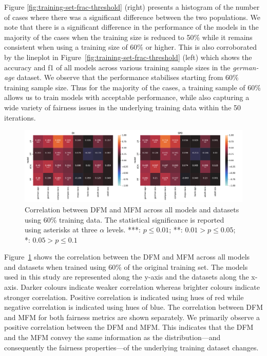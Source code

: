 \documentclass{article}
\begin{document}
Figure \ref{fig:training-set-frac-threshold} (right) presents
a histogram of the number of cases where there was a significant
difference between the two populations. We note that there is
a significant difference in the performance of the models in the
majority of the cases when the training size is reduced to 50\% while
it remains consistent when using a training size of 60\% or
higher. This is also corroborated by the lineplot in
Figure \ref{fig:training-set-frac-threshold} (left) which shows the
accuracy and f1 of all models across various training sample sizes in
the \emph{german-age} dataset. We observe that the performance
stabilises starting from 60\% training sample size. Thus for the
majority of the cases, a training sample of 60\% allows us to train
models with acceptable performance, while also capturing a wide
variety of fairness issues in the underlying training data within the
50 iterations.

\begin{figure}
  \centering
  \includegraphics[width=\linewidth]{heatmap--corr--training-sets-frac.pdf}
  \caption{Correlation between DFM and MFM across all models and
  datasets using 60\% training data. The statistical significance is
  reported using asterisks at three $\alpha$ levels. ***: $p \le
  0.01$; **: $0.01 > p \le 0.05$; *: $0.05 > p \le 0.1$}
  \label{fig:heatmap--corr--training-sets-frac}
\end{figure}

Figure \ref{fig:heatmap--corr--training-sets-frac} shows the
correlation between the DFM and MFM across all models and datasets
when trained using 60\% of the original training set. The models used
in this study are represented along the y-axis and the datasets along
the x-axis. Darker colours indicate weaker correlation whereas
brighter colours indicate stronger correlation. Positive correlation
is indicated using hues of red while negative correlation is indicated
using hues of blue. The correlation between DFM and MFM for both
fairness metrics are shown separately. We primarily observe a positive
correlation between the DFM and MFM. This indicates that the DFM and
the MFM convey the same information as the distribution---and
consequently the fairness properties---of the underlying training
dataset changes.
\end{document}
